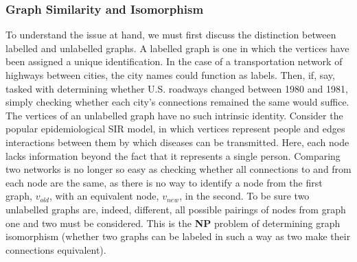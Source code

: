 \documentclass[11pt]{article}
\begin{document}
\subsubsection{Graph Similarity and Isomorphism}
To understand the issue at hand, we must first discuss the distinction between labelled and unlabelled graphs. A labelled graph is one in which the vertices have been assigned a unique identification. In the case of a transportation network of highways between cities, the city names could function as labels. Then, if, say, tasked with determining whether U.S. roadways changed between 1980 and 1981, simply checking whether each city's connections remained the same would suffice. The vertices of an unlabelled graph have no such intrinsic identity. Consider the popular epidemiological SIR model, in which vertices represent people and edges interactions between them by which diseases can be transmitted. Here, each node lacks information beyond the fact that it represents a single person. Comparing two networks is no longer so easy as checking whether all connections to and from each node are the same, as there is no way to identify a node from the first graph, $v_{old}$, with an equivalent node, $v_{new}$, in the second. To be sure two unlabelled graphs are, indeed, different, all possible pairings of nodes from graph one and two must be considered. This is the \textbf{NP} problem of determining graph isomorphism (whether two graphs can be labeled in such a way as two make their connections equivalent). \vspace{1mm}
\end{document}
